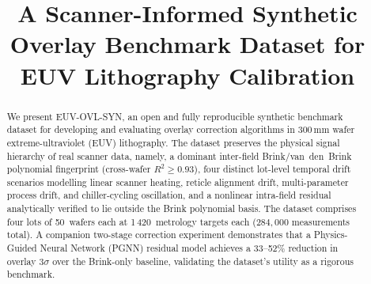 \documentclass[10pt,conference]{IEEEtran}
\begin{document}
\title{A Scanner-Informed Synthetic Overlay Benchmark Dataset for EUV Lithography Calibration}



\author{

}

\maketitle

\begin{abstract}
We present \textsc{EUV-OVL-SYN}, an open and fully reproducible synthetic
benchmark dataset for developing and evaluating overlay correction algorithms
in 300\,mm wafer extreme-ultraviolet (EUV) lithography.
The dataset preserves the physical signal hierarchy of real scanner data, namely,
a dominant inter-field Brink/van~den~Brink polynomial fingerprint
(cross-wafer $R^2 \ge 0.93$), four distinct lot-level temporal drift
scenarios modelling linear scanner heating, reticle alignment drift,
multi-parameter process drift, and chiller-cycling oscillation, and a
nonlinear intra-field residual analytically verified to lie outside the
Brink polynomial basis. 
The dataset comprises four lots of 50~wafers each at 1\,420~metrology targets each
($284{,}000$ measurements total).
A companion two-stage correction experiment demonstrates that a
Physics-Guided Neural Network (PGNN) residual model achieves a 33–52\%
reduction in overlay $3\sigma$ over the Brink-only baseline, validating
the dataset's utility as a rigorous benchmark.
\end{abstract}
\end{document}
